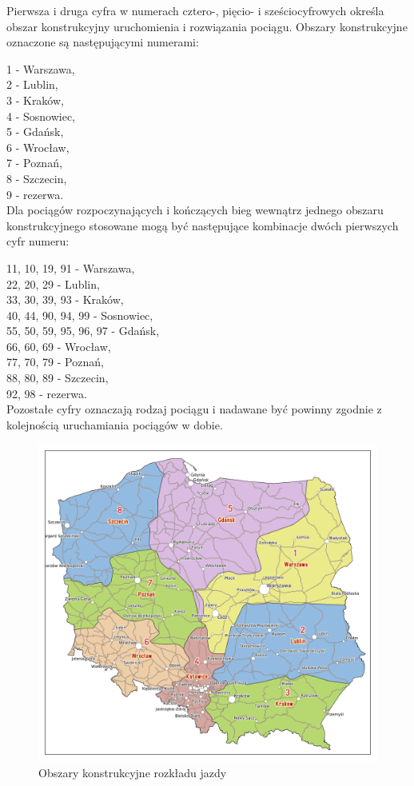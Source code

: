 Pierwsza i druga cyfra w numerach cztero-, pięcio- i sześciocyf­rowych określa obszar konstruk­cyjny urucho­mienia i rozwią­zania pociągu. Obszary konstruk­cyjne ozna­czone są nastę­pują­cymi numerami:

1 - Warszawa,\\
2 - Lublin,\\
3 - Kraków,\\
4 - Sosnowiec,\\
5 - Gdańsk,\\
6 - Wrocław,\\
7 - Poznań,\\
8 - Szczecin,\\
9 - rezerwa.\\

Dla pociągów rozpoczyna­jących i kończących bieg wewnątrz jednego obszaru konstrukcyj­nego stoso­wane mogą być następu­jące kombi­nacje dwóch pierwszych cyfr numeru:

11, 10, 19, 91 - Warszawa,\\
22, 20, 29 - Lublin,\\
33, 30, 39, 93 - Kraków,\\
40, 44, 90, 94, 99 - Sosnowiec,\\
55, 50, 59, 95, 96, 97 - Gdańsk,\\
66, 60, 69 - Wrocław,\\
77, 70, 79 - Poznań,\\
88, 80, 89 - Szczecin,\\
92, 98 - rezerwa.\\
Pozostałe cyfry ozna­czają rodzaj pociągu i nada­wane być powinny zgodnie z kolej­nością urucha­miania pociągów w dobie.
\begin{figure}
	\includegraphics[width=12.5cm]{skryptkierownik-img/obszary-konstrukcyjne.png}	
	\caption{Obszary konstrukcyjne rozkładu jazdy}
\end{figure}

